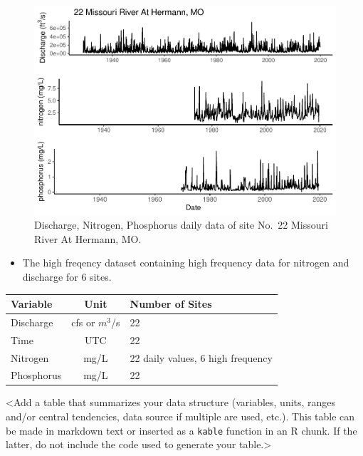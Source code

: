 \documentclass[12pt,]{article}
\providecommand{\tightlist}{%
  \setlength{\itemsep}{0pt}\setlength{\parskip}{0pt}}
\begin{document}
\begin{figure}
\centering
\includegraphics{Missouri-Reasearch-Project---FINAL_files/figure-latex/datawxample-1.pdf}
\caption{\label{fig:dataexample} Discharge, Nitrogen, Phosphorus daily
data of site No.~22 Missouri River At Hermann, MO.}
\end{figure}

\begin{itemize}
\tightlist
\item
  The high freqency dataset containing high frequency data for nitrogen
  and discharge for 6 sites.
\end{itemize}

\begin{longtable}[]{@{}lcl@{}}
\toprule
Variable & Unit & Number of Sites\tabularnewline
\midrule
\endhead
Discharge & cfs or \(m^{3}\)/s & 22\tabularnewline
Time & UTC & 22\tabularnewline
Nitrogen & mg/L & 22 daily values, 6 high frequency\tabularnewline
Phosphorus & mg/L & 22\tabularnewline
\bottomrule
\end{longtable}

\textless Add a table that summarizes your data structure (variables,
units, ranges and/or central tendencies, data source if multiple are
used, etc.). This table can be made in markdown text or inserted as a
\texttt{kable} function in an R chunk. If the latter, do not include the
code used to generate your table.\textgreater{}
\end{document}
